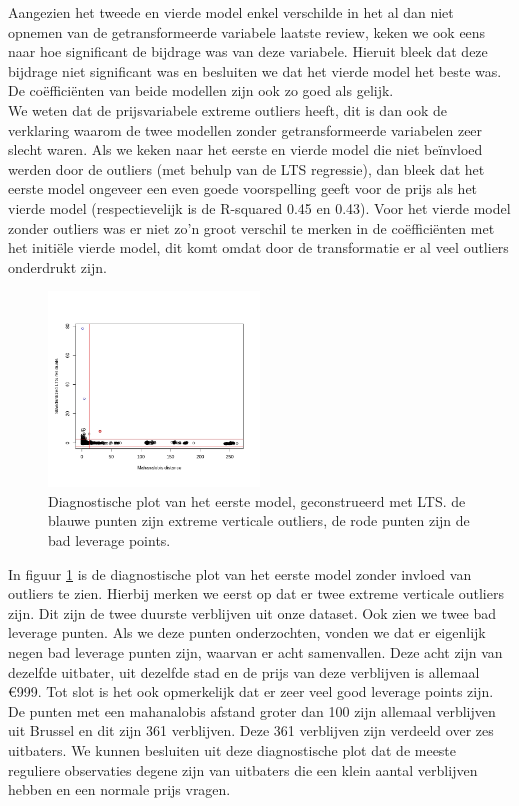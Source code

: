 \documentclass[a4paper,kulak]{kulakarticle} %
\begin{document}
Aangezien het tweede en vierde model enkel verschilde in het al dan niet opnemen van de getransformeerde variabele laatste review, keken we ook eens naar hoe significant de bijdrage was van deze variabele. Hieruit bleek dat deze bijdrage niet significant was en besluiten we dat het vierde model het beste was. De co\"effici\"enten van beide modellen zijn ook zo goed als gelijk.\\


We weten dat de prijsvariabele extreme outliers heeft, dit is dan ook de verklaring waarom de twee modellen zonder getransformeerde variabelen zeer slecht waren. Als we keken naar het eerste en vierde model die niet be\"invloed werden door de outliers (met behulp van de LTS regressie), dan bleek dat het eerste model ongeveer een even goede voorspelling geeft voor de prijs als het vierde model (respectievelijk is de R-squared 0.45 en 0.43). Voor het vierde model zonder outliers was er niet zo'n groot verschil te merken in de co\"effici\"enten met het initi\"ele vierde model, dit komt omdat door de transformatie er al veel outliers onderdrukt zijn.\\
\begin{figure}[H]
	\begin{center}
		\includegraphics[width=0.5\textwidth]{diagnosticPlot2eVr.jpeg}
	\end{center}
	\caption{Diagnostische plot van het eerste model, geconstrueerd met LTS. de blauwe punten zijn extreme verticale outliers, de rode punten zijn de bad leverage points.}
	\label{fig:diagnPlot}
\end{figure}
In figuur \ref{fig:diagnPlot} is de diagnostische plot van het eerste model zonder invloed van outliers te zien. Hierbij merken we eerst op dat er twee extreme verticale outliers zijn. Dit zijn de twee duurste verblijven uit onze dataset. Ook zien we twee bad leverage punten. Als we deze punten onderzochten, vonden we dat er eigenlijk negen bad leverage punten zijn, waarvan er acht samenvallen. Deze acht zijn van dezelfde uitbater, uit dezelfde stad en de prijs van deze verblijven is allemaal \euro999. Tot slot is het ook opmerkelijk dat er zeer veel good leverage points zijn. De punten met een mahanalobis afstand groter dan 100 zijn allemaal verblijven uit Brussel en dit zijn 361 verblijven. Deze 361 verblijven zijn verdeeld over zes uitbaters. We kunnen besluiten uit deze diagnostische plot dat de meeste reguliere observaties degene zijn van uitbaters die een klein aantal verblijven hebben en een normale prijs vragen. 
\end{document}
